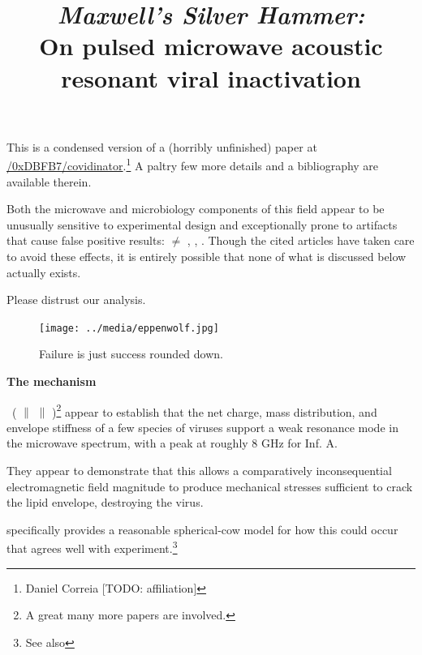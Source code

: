 \documentclass[fleqn,10pt]{paper}
\title{{\it Maxwell's Silver Hammer:}\\ On pulsed microwave acoustic resonant viral inactivation}
\begin{document}
\maketitle


This is a condensed version of a (horribly unfinished) paper at \href{https://www.github.com/0xDBFB7/covidinator/documents/paper.pdf}{\faGithub/0xDBFB7/covidinator}.\footnote{Daniel Correia [TODO: affiliation] } A paltry few more details and a bibliography are available therein.


%



Both the microwave and microbiology components of this field appear to be unusually sensitive to experimental design and exceptionally prone to artifacts that cause false positive results: \cite{Microwave1982} $\neq$ \cite{Resonances1987}, , \cite{Comprehensive2018}. Though the cited articles have taken care to avoid these effects, it is entirely possible that none of what is discussed below actually exists.

Please distrust our analysis.


\begin{figure}[H]
	\texttt{[image: ../media/eppenwolf.jpg]}
	\caption{Failure is just success rounded down.}
\end{figure}


\clearpage

{\Large \textbf{The mechanism}}


\cite{Microwave2009} \textrightarrow \ (\cite{focusing2014} $\parallel$ \cite{Efficient2015} $\parallel$ \cite{Resonant2017})\footnote{A great many more papers are involved.} appear to establish that the net charge, mass distribution, and envelope stiffness of a few species of viruses support a weak resonance mode in the microwave spectrum, with a peak at roughly 8 GHz for Inf. A.

They appear to demonstrate that this allows a comparatively inconsequential electromagnetic field magnitude to produce mechanical stresses sufficient to crack the lipid envelope, destroying the virus.

\cite{Efficient2015} specifically provides a reasonable spherical-cow model for how this could occur that agrees well with experiment.\footnote{See also }
\end{document}

